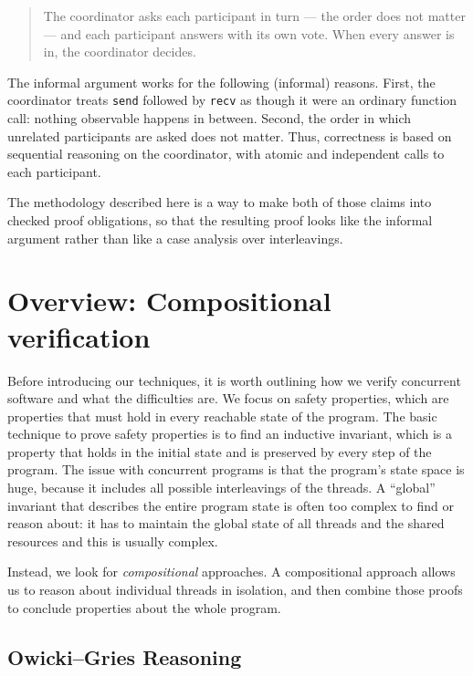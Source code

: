 \documentclass[11pt]{article}
\newcommand{\code}[1]{\texttt{#1}}
\begin{document}
\begin{quote}
The coordinator asks each participant in turn --- the order does not matter ---
and each participant answers with its own vote. When every answer is in, the
coordinator decides.
\end{quote}

The informal argument works for the following (informal) reasons.
First, the coordinator treats
\code{send} followed by \code{recv} as though it were an ordinary function call:
nothing observable happens in between. Second, the order in which unrelated
participants are asked does not matter.
Thus, correctness is based on sequential reasoning on the coordinator, with atomic
and independent calls to each participant.

The methodology described here is a way
to make both of those claims into checked proof obligations, so that the
resulting proof looks like the informal argument rather than like a case
analysis over interleavings.

\section{Overview: Compositional verification}\label{sec:comp}

Before introducing our techniques, it is worth outlining how we verify concurrent 
software and what the difficulties are. 
We focus on safety properties, which are properties that must hold in every reachable state of the program.
The basic technique to prove safety properties is to find an inductive invariant, 
which is a property that holds in the initial state and is preserved by every step of the program.
The issue with concurrent programs is that the program's state space is huge, 
because it includes all possible interleavings of the threads.
A ``global'' invariant that describes the entire program state is often too complex to find or reason about:
it has to maintain the global state of all threads and the shared resources and this is usually complex.

Instead, we look for \emph{compositional} approaches.
A compositional approach allows us to reason about individual threads in isolation, 
and then combine those proofs to conclude properties about the whole program.


\subsection*{Owicki--Gries Reasoning}
\end{document}
